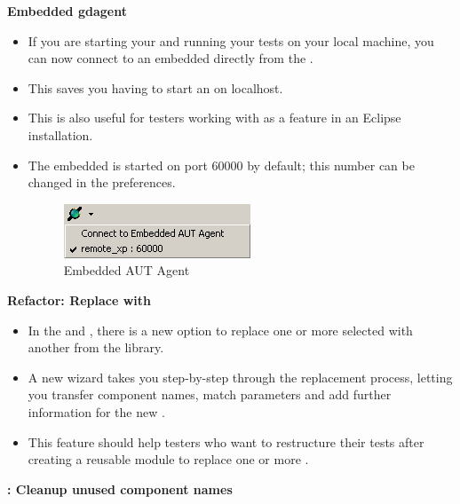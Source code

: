 
\textbf{Embedded gdagent{}}\\
\begin{itemize}
\item If you are starting your \gdaut{} and running your tests on your local machine, 
you can now connect to an embedded \gdagent{} directly from the \ite. 
\item This saves you having to start an \gdagent{} on localhost. 
\item This is also useful for testers working with \jb{} as a feature in an Eclipse installation. 
\item The embedded \gdagent{} is started on port 60000 by default; this number can be changed in the preferences.

\begin{figure}[h]
\begin{center}
\includegraphics{52/ps/EmbeddedAgent}
\caption{Embedded AUT Agent}
\label{RNEmbeddedAgent}
\end{center}
\end{figure}


\end{itemize}

\textbf{Refactor: Replace with \gdcase{}}
\begin{itemize}
\item In the \gdtestcaseeditor{} and \gdtestsuiteeditor{}, there is a new option to replace one or more selected \gdcases{} with another \gdcase{} from the library. 
\item A new wizard takes you step-by-step through the replacement process, letting you transfer component names, match parameters and add further information for the new \gdcase{}.
\item This feature should help testers who want to restructure their tests after creating a reusable module to replace one or more \gdcases{}. 
\end{itemize}

\textbf{\gdomeditor{}: Cleanup unused component names}

